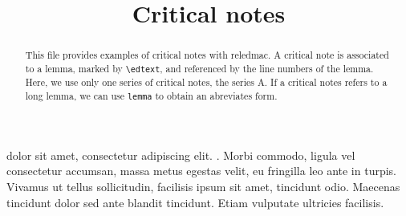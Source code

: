 \documentclass{article}
\begin{document}
\begin{english}
\title{Critical notes}
\maketitle
\begin{abstract}
This file provides examples of critical notes with reledmac. 
A critical note is associated to a lemma, marked by \verb+\edtext+, and referenced by the line numbers of the lemma.
Here, we use only one series of critical notes, the series A. If a critical notes refers to a long lemma, we can use \verb+lemma+ to obtain an abreviates form.
\end{abstract}
\end{english}

\beginnumbering
\pstart
{}  dolor sit amet, consectetur adipiscing elit. . Morbi commodo, ligula vel consectetur accumsan, massa metus egestas velit, eu fringilla leo ante in turpis. Vivamus ut tellus sollicitudin, facilisis ipsum sit amet, tincidunt odio. Maecenas tincidunt dolor sed ante blandit tincidunt. Etiam vulputate ultricies facilisis.
\pend
\endnumbering
\end{document}
